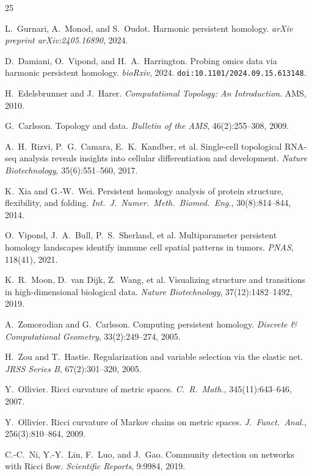 \documentclass[11pt]{article}
\begin{document}

\begin{thebibliography}{25}

L.~Gurnari, A.~Monod, and S.~Oudot.
Harmonic persistent homology.
\emph{arXiv preprint arXiv:2405.16890}, 2024.

D.~Damiani, O.~Vipond, and H.~A.~Harrington.
Probing omics data via harmonic persistent homology.
\emph{bioRxiv}, 2024.
\texttt{doi:10.1101/2024.09.15.613148}.

H.~Edelsbrunner and J.~Harer.
\emph{Computational Topology: An Introduction}.
AMS, 2010.

G.~Carlsson.
Topology and data.
\emph{Bulletin of the AMS}, 46(2):255--308, 2009.

A.~H.~Rizvi, P.~G.~Camara, E.~K.~Kandber, et al.
Single-cell topological RNA-seq analysis reveals insights into cellular differentiation and development.
\emph{Nature Biotechnology}, 35(6):551--560, 2017.

K.~Xia and G.-W.~Wei.
Persistent homology analysis of protein structure, flexibility, and folding.
\emph{Int.\ J.\ Numer.\ Meth.\ Biomed.\ Eng.}, 30(8):814--844, 2014.

O.~Vipond, J.~A.~Bull, P.~S.~Sherland, et al.
Multiparameter persistent homology landscapes identify immune cell spatial patterns in tumors.
\emph{PNAS}, 118(41), 2021.

K.~R.~Moon, D.~van Dijk, Z.~Wang, et al.
Visualizing structure and transitions in high-dimensional biological data.
\emph{Nature Biotechnology}, 37(12):1482--1492, 2019.

A.~Zomorodian and G.~Carlsson.
Computing persistent homology.
\emph{Discrete \& Computational Geometry}, 33(2):249--274, 2005.

H.~Zou and T.~Hastie.
Regularization and variable selection via the elastic net.
\emph{JRSS Series B}, 67(2):301--320, 2005.

Y.~Ollivier.
Ricci curvature of metric spaces.
\emph{C.\ R.\ Math.}, 345(11):643--646, 2007.

Y.~Ollivier.
Ricci curvature of Markov chains on metric spaces.
\emph{J.\ Funct.\ Anal.}, 256(3):810--864, 2009.

C.-C.~Ni, Y.-Y.~Lin, F.~Luo, and J.~Gao.
Community detection on networks with Ricci flow.
\emph{Scientific Reports}, 9:9984, 2019.


\end{thebibliography}
\end{document}
